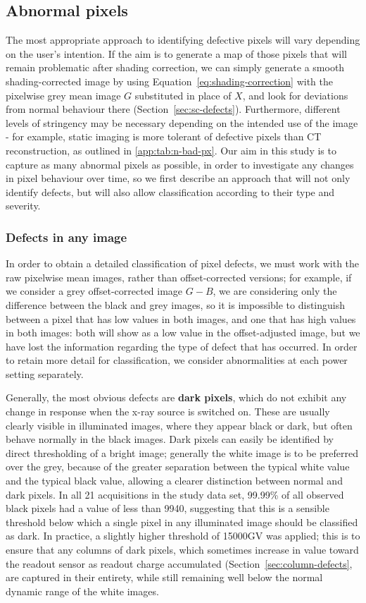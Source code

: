 \documentclass[\main/IO-Pixels.tex]{subfiles}
\begin{document}
\subsection{Abnormal pixels}

The most appropriate approach to identifying defective pixels will vary depending on the user's intention. If the aim is to generate a map of those pixels that will remain problematic after shading correction, we can simply generate a smooth shading-corrected image by using Equation~\ref{eq:shading-correction} with the pixelwise grey mean image $G$ substituted in place of $X$, and look for deviations from normal behaviour there (Section~\ref{sec:sc-defects}). Furthermore, different levels of stringency may be necessary depending on the intended use of the image - for example, static imaging is more tolerant of defective pixels than CT reconstruction, as outlined in \ref{app:tab:n-bad-px}.  Our aim in this study is to capture as many abnormal pixels as possible, in order to investigate any changes in pixel behaviour over time, so we first describe an approach that will not only identify defects, but will also allow classification according to their type and severity.

\subsubsection{Defects in any image}
In order to obtain a detailed classification of pixel defects, we must work with the raw pixelwise mean images, rather than offset-corrected versions; for example, if we consider a grey offset-corrected image $G-B$, we are considering only the difference between the black and grey images, so it is impossible to distinguish between a pixel that has low values in both images, and one that has high values in both images: both will show as a low value in the offset-adjusted image, but we have lost the information regarding the type of defect that has occurred. In order to retain more detail for classification, we consider abnormalities at each power setting separately.

Generally, the most obvious defects are \textbf{dark pixels}, which do not exhibit any change in response when the x-ray source is switched on. These are usually clearly visible in illuminated images, where they appear black or dark, but often behave normally in the black images. Dark pixels can easily be identified by direct thresholding of a bright image; generally the white image is to be preferred over the grey, because of the greater separation between the typical white value and the typical black value, allowing a clearer distinction between normal and dark pixels. In all 21 acquisitions in the study data set, 99.99\% of all observed black pixels had a value of less than 9940, suggesting that this is a sensible threshold below which a single pixel in any illuminated image should be classified as dark. In practice, a slightly higher threshold of 15000GV was applied; this is to ensure that any columns of dark pixels, which sometimes increase in value toward the readout sensor as readout charge accumulated (Section~\ref{sec:column-defects}, are captured in their entirety, while still remaining well below the normal dynamic range of the white images.
\end{document}
